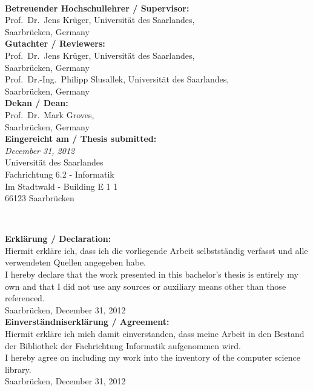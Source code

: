 \clearpage
\thispagestyle{empty}
~
\vfill
\begin{flushleft}
{
        \small
%
        \textbf{Betreuender Hochschullehrer / Supervisor:}\\
        Prof.~Dr.~Jens Kr\"uger, Universit\"at des Saarlandes,\\
          Saarbr\"ucken, Germany\\[\baselineskip]

        \textbf{Gutachter / Reviewers:}\\
        Prof.~Dr.~Jens Kr\"uger, Universit\"at des Saarlandes,\\
          Saarbr\"ucken, Germany\\[\baselineskip]
        Prof.~Dr.-Ing.~Philipp Slusallek, Universit\"at des Saarlandes,\\
          Saarbr\"ucken, Germany\\[\baselineskip]

        \textbf{Dekan / Dean:}\\
        Prof.~Dr.~Mark Groves,\\
          Saarbr\"ucken, Germany\\[\baselineskip]

\vspace{2.5cm}
       \textbf{Eingereicht am / Thesis submitted:}\\
       {\em December 31, 2012}\\[\baselineskip]
\vspace{2.5cm}
	Universit\"at des Saarlandes\\
	Fachrichtung 6.2 - Informatik \\
	Im Stadtwald - Building E 1 1\\
	66123 Saarbr\"ucken\\
}
\end{flushleft}



%
%

\clearpage
\thispagestyle{empty}
~
\vfill
\begin{flushleft}
{
        \small
%
	\textbf{Erkl\"arung / Declaration:}\\
	Hiermit erkl\"are ich, dass ich die vorliegende Arbeit selbstst\"andig verfasst und alle verwendeten Quellen angegeben habe.\\
	I hereby declare that the work presented in this bachelor's thesis is entirely my own and that I did not use any sources or auxiliary means other than those referenced.\\[\baselineskip]
	Saarbr\"ucken, December 31, 2012\\
\vspace{4cm}
	\textbf{Einverst\"andniserkl\"arung / Agreement:}\\
	Hiermit erkl\"are ich mich damit einverstanden, dass meine Arbeit in den Bestand der Bibliothek der Fachrichtung Informatik aufgenommen wird.\\
	I hereby agree on including my work into the inventory of the computer science library.\\[\baselineskip]
	Saarbr\"ucken, December 31, 2012
\vspace{3cm}
}
\end{flushleft}

